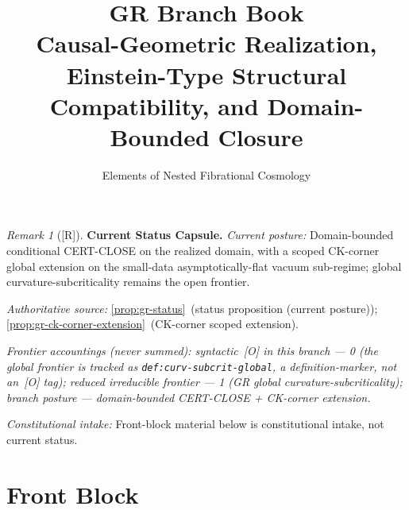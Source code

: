 \documentclass[12pt,oneside]{amsbook}
\theoremstyle{plain}
\theoremstyle{definition}
\theoremstyle{remark}
\newtheorem{remark}[theorem]{Remark}
\newcommand{\status}[1]{\textup{[#1]}}
\begin{document}
\title{GR Branch Book\\[6pt]
 Causal-Geometric Realization, Einstein-Type Structural\\
 Compatibility, and Domain-Bounded Closure}
\author{Elements of Nested Fibrational Cosmology}
\date{}
\maketitle

\tableofcontents

\bigskip


\begin{remark}[\status{R}]\label{cap:GR-status}
\textbf{Current Status Capsule.}
\emph{Current posture:} Domain-bounded conditional CERT-CLOSE on the realized domain, with a scoped CK-corner global extension on the small-data asymptotically-flat vacuum sub-regime; global curvature-subcriticality remains the open frontier.

\emph{Authoritative source:} \ref{prop:gr-status}~(status proposition (current posture)); \ref{prop:gr-ck-corner-extension}~(CK-corner scoped extension).

\emph{Frontier accountings (never summed): syntactic~[O] in this branch --- 0 (the global frontier is tracked as \texttt{def:curv-subcrit-global}, a definition-marker, not an~[O] tag); reduced irreducible frontier --- 1 (GR global curvature-subcriticality); branch posture --- domain-bounded CERT-CLOSE + CK-corner extension.}

\emph{Constitutional intake:} Front-block material below is constitutional intake, not current status.
\end{remark}

\section*{Front Block}
\end{document}
